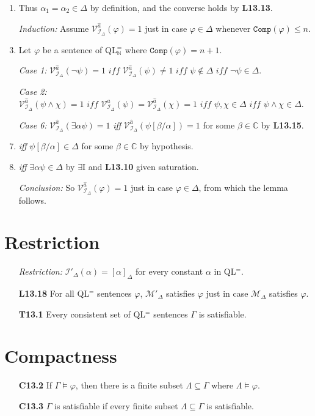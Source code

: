 \documentclass[a4paper, 11pt]{article} %
\newcommand{\I}{\mathcal{I}}
\newcommand{\M}{\mathcal{M}}
\newcommand{\N}{\mathbb{N}}
\newcommand{\C}{\mathbb{C}}
\newcommand{\comp}{\texttt{Comp}}
\newcommand{\VV}[2]{\mathcal{V}_{#1}^{#2}} %
\newcommand{\va}[1]{\hat{#1}} %
\newcommand{\qt}[2]{#1 #2} %
\newcommand{\unisub}[2]{[#1/#2]}
\renewcommand{\models}{\vDash}
\def\metaA{\ensuremath{\varphi}}
\def\metaB{\ensuremath{\psi}}
\def\metaC{\ensuremath{\chi}}
\begin{document}
\begin{enumerate}
  \item Thus $\alpha_1=\alpha_2\in\Delta$ by definition, and the converse holds by \textbf{L13.13}.
  \item[\it Induction:] Assume $\VV{\I_\Delta}{\va{a}}(\metaA)=1$ just in case $\metaA\in\Delta$ whenever $\comp(\metaA)\leq n$.
    \setcounter{enumi}{0}
  \item Let $\metaA$ be a sentence of QL$^=_{\N}$ where $\comp(\metaA)=n+1$.
  \item[\it Case 1:]     
    $ \VV{\I_\Delta}{\va{a}}(\neg\metaB)=1
      \textit{ iff } \VV{\I_\Delta}{\va{a}}(\metaB)\neq 1
      \textit{ iff } \metaB\notin\Delta
      \textit{ iff } \neg\metaB\in\Delta.$
  \item[\it Case 2:]     
    $ \VV{\I_\Delta}{\va{a}}(\metaB\wedge\metaC)=1
      \textit{ iff } \VV{\I_\Delta}{\va{a}}(\metaB)=\VV{\I_\Delta}{\va{a}}(\metaC)=1 
      \textit{ iff } \metaB,\metaC\in\Delta 
      \textit{ iff } \metaB\wedge\metaC\in\Delta.$
  \item[\it Case 6:] $\VV{\I_\Delta}{\va{a}}(\qt{\exists}{\alpha}\metaB)=1$  \textit{iff} $\VV{\I_\Delta}{\va{a}}(\metaB\unisub{\beta}{\alpha})=1$ for some $\beta\in\C$ by \textbf{L13.15}.
    \setcounter{enumi}{0}
  \item \textit{iff} $\metaB\unisub{\beta}{\alpha}\in\Delta$ for some $\beta\in\C$ by hypothesis.
  \item \textit{iff} $\qt{\exists}{\alpha}\metaB\in\Delta$ by $\exists$I and \textbf{L13.10} given saturation.  
  \item[\it Conclusion:] So $\VV{\I_\Delta}{\va{a}}(\metaA)=1$ just in case $\metaA\in\Delta$, from which the lemma follows.
\end{enumerate}

\section*{Restriction}

\begin{enumerate}
  \item[\it Restriction:] $\I'_\Delta(\alpha)=[\alpha]_\Delta$ for every constant $\alpha$ in QL$^=$.
  \item[\bf L13.18] For all QL$^=$ sentences $\metaA$, $\M'_\Delta$ satisfies $\metaA$ just in case $\M_\Delta$ satisfies $\metaA$.
  \item[\bf T13.1] Every consistent set of QL$^=$ sentences $\Gamma$ is satisfiable.
\end{enumerate}


\section*{Compactness}

\begin{itemize}
  \item[\bf C13.2] If $\Gamma\models\metaA$, then there is a finite subset $\Lambda\subseteq\Gamma$ where $\Lambda\models\metaA$.
  \item[\bf C13.3] $\Gamma$ is satisfiable if every finite subset $\Lambda\subseteq\Gamma$ is satisfiable.
\end{itemize}
\end{document}
